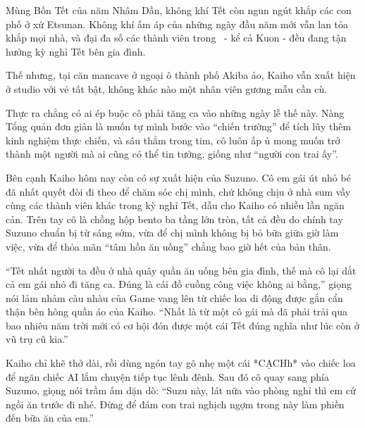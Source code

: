 \documentclass[../main.tex]{subfiles}
\begin{document}

Mùng Bốn Tết của năm Nhâm Dần, không khí Tết còn ngun ngút khắp các con phố ở xứ Etsunan. Không khí ấm áp của những ngày đầu năm mới vẫn lan tỏa khắp mọi nhà, và đại đa số các thành viên trong \hll\ - kể cả Kuon - đều đang tận hưởng kỳ nghỉ Tết bên gia đình.

Thế nhưng, tại căn mancave ở ngoại ô thành phố Akiba ảo, Kaiho vẫn xuất hiện ở studio với vẻ tất bật, không khác nào một nhân viên gương mẫu cần cù.

Thực ra chẳng có ai ép buộc cô phải tăng ca vào những ngày lễ thế này. Nàng Tổng quản đơn giản là muốn tự mình bước vào ``chiến trường'' để tích lũy thêm kinh nghiệm thực chiến, và sâu thẳm trong tim, cô luôn ấp ủ mong muốn trở thành một người mà ai cũng có thể tin tưởng, giống như ``người con trai ấy''.

Bên cạnh Kaiho hôm nay còn có sự xuất hiện của Suzuno. Cô em gái út nhỏ bé đã nhất quyết đòi đi theo để chăm sóc chị mình, chứ không chịu ở nhà sum vầy cùng các thành viên khác trong kỳ nghỉ Tết, dẫu cho Kaiho có nhiều lần ngăn cản. Trên tay cô là chồng hộp bento ba tầng lớn tròn, tất cả đều do chính tay Suzuno chuẩn bị từ sáng sớm, vừa để chị mình không bị bỏ bữa giữa giờ làm việc, vừa để thỏa mãn ``tâm hồn ăn uống'' chẳng bao giờ hết của bản thân.

``Tết nhất người ta đều ở nhà quây quần ăn uống bên gia đình, thế mà cô lại dắt cả em gái nhỏ đi tăng ca. Đúng là cái đồ cuồng công việc không ai bằng,'' giọng nói lảm nhảm càu nhàu của Game vang lên từ chiếc loa di động được gắn cẩn thận bên hông quần áo của Kaiho. ``Nhất là từ một cô gái mà đã phải trải qua bao nhiêu năm trời mới có cơ hội đón được một cái Tết đúng nghĩa như lúc còn ở vũ trụ cũ kia.''

Kaiho chỉ khẽ thở dài, rồi dùng ngón tay gõ nhẹ một cái *CẠCHh* vào chiếc loa để ngăn chiếc AI lắm chuyện tiếp tục lênh đênh. Sau đó cô quay sang phía Suzuno, giọng nói trầm ấm dặn dò: ``Suzu này, lát nữa vào phòng nghỉ thì em cứ ngồi ăn trước đi nhé. Đừng để đám con trai nghịch ngợm trong này làm phiền đến bữa ăn của em.''
\end{document}
